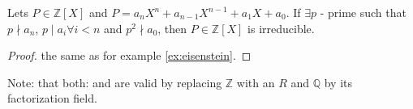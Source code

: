 \begin{lemma}
  Lets $P \in \mathbb{Z}\left[X\right]$ and
  $P = a_n X^n + a_{n-1} X^{n-1} + a_1 X + a_0$. If $\exists p$ -
  prime such that $p \nmid a_n$, $p \mid a_i \forall i < n$ and
  $p^2 \nmid a_0$, then $P \in \mathbb{Z}\left[X\right]$ is
  irreducible. 
  \begin{proof}
    the same as for example \ref{ex:eisenstein}.
  \end{proof}
  \label{lem:eisenstein}
\end{lemma}

Note: that both:  and  are
valid by replacing $\mathbb{Z}$ with an  $R$ and
$\mathbb{Q}$ by its factorization field.

